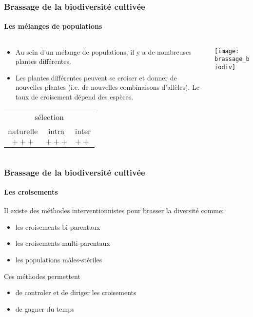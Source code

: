 \begin{frame}
\frametitle{Brassage de la biodiversité cultivée}
\framesubtitle{Les mélanges de populations}


\begin{columns}
\begin{column}{.5\textwidth}

\begin{itemize}
\item Au sein d'un mélange de populations, il y a de nombreuses plantes différentes.
\item Les plantes différentes peuvent se croiser et donner de nouvelles plantes (i.e. de nouvelles combinaisons d'allèles).
Le taux de croisement dépend des espèces.
\end{itemize}

\begin{center}
\begin{tabular}{ccc}
\hline
\multicolumn{3}{c}{sélection} \\
naturelle & intra & inter \\
\hline
$+++$ & $+++$ & $++$ \\
\hline
\end{tabular}
\end{center}

\end{column}

\begin{column}{.5\textwidth}
\texttt{[image: brassage\_biodiv]}
\end{column}
\end{columns}

\end{frame}


\begin{frame}
\frametitle{Brassage de la biodiversité cultivée}
\framesubtitle{Les croisements}

Il existe des méthodes interventionnistes pour brasser la diversité comme:

\begin{itemize}
\item les croisements bi-parentaux
\item les croisements multi-parentaux
\item les populations mâles-stériles
\end{itemize}

Ces méthodes permettent 

\begin{itemize}
\item de controler et de diriger les croisements
\item de gagner du temps
\end{itemize}

\end{frame}



